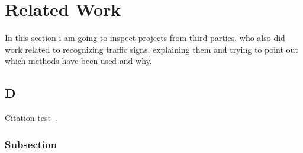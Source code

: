
\chapter{Related Work}\label{chapter:Related Work}
In this section i am going to inspect projects from third parties, who also did work related to recognizing traffic signs, explaining them and trying to point out which methods have been used and why.
\section{D}
Citation test~\parencite{latex}.

\subsection{Subsection}
